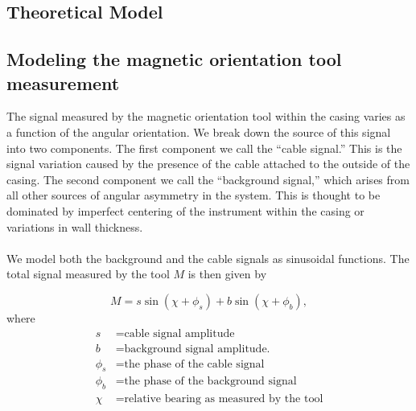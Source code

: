 \documentclass[paper=a4, fontsize=11pt]{scrartcl}
\numberwithin{equation}{section}		%
\numberwithin{figure}{section}			%
\numberwithin{table}{section}				%
\begin{document}
\begin{appendices}

\section{Theoretical Model}\label{section:theory}
\subsection{Modeling the magnetic orientation tool measurement}
The signal measured by the magnetic orientation tool within the casing varies as a function of the angular orientation.  We  break down the source of this signal into two components.  The first component we call the ``cable signal.''  This is the signal variation caused by the presence of the cable attached to the outside of the casing.  The second component we call the ``background signal,'' which arises from all other sources of angular asymmetry in the system.  This is thought to be dominated by imperfect centering of the instrument within the casing or variations in wall thickness.

\paragraph{} 
We model both the background and the cable signals as sinusoidal functions. The total signal measured by the tool $M$ is then given by

\begin{equation} \label{eq:trig_sig}
    M = s \sin\left(\chi + \phi_s\right) + b \sin\left(\chi + \phi_b\right),
\end{equation}
where
\begin{align*}
        s &= \text{cable signal amplitude} \\
        b &= \text{background signal amplitude.} \\
        \phi_s &= \text{the phase of the cable signal}\\
        \phi_b &= \text{the phase of the background signal}\\
        \chi &= \text{relative bearing as measured by the tool}\\
\end{align*}


\end{appendices}
\end{document}
